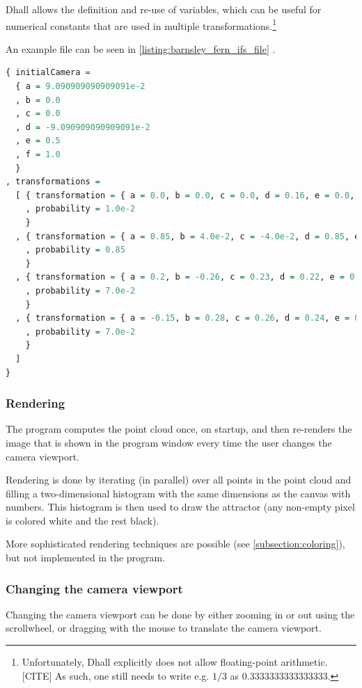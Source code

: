 \documentclass[11pt]{article}
\begin{document}
Dhall allows the definition and re-use of variables, which can be useful
for numerical constants that are used in multiple transformations.\footnote{Unfortunately, Dhall explicitly does not allow floating-point arithmetic.[CITE]
As such, one still needs to write e.g. \(1/3\) as \(0.3333333333333333\).}

An example file can be seen in \autoref{listing:barnsley_fern_ifs_file} .


\begin{lstlisting}[float, language=Haskell, frame=single, breaklines=true, basicstyle=\scriptsize\tt, captionpos=b, caption={barnsley\_fern.ifs, representing \autoref{ifs:barnsley_fern}}, label={listing:barnsley_fern_ifs_file}]
{ initialCamera =
  { a = 9.090909090909091e-2
  , b = 0.0
  , c = 0.0
  , d = -9.090909090909091e-2
  , e = 0.5
  , f = 1.0
  }
, transformations =
  [ { transformation = { a = 0.0, b = 0.0, c = 0.0, d = 0.16, e = 0.0, f = 0.0 }
    , probability = 1.0e-2
    }
  , { transformation = { a = 0.85, b = 4.0e-2, c = -4.0e-2, d = 0.85, e = 0.0, f = 1.6 }
    , probability = 0.85
    }
  , { transformation = { a = 0.2, b = -0.26, c = 0.23, d = 0.22, e = 0.0, f = 1.6 }
    , probability = 7.0e-2
    }
  , { transformation = { a = -0.15, b = 0.28, c = 0.26, d = 0.24, e = 0.0, f = 0.44 }
    , probability = 7.0e-2
    }
  ]
}

\end{lstlisting}

\subsubsection{Rendering}
\label{sec:org6dfbb5d}
The program computes the point cloud once, on startup, and then re-renders the image that is shown in the program window
every time the user changes the camera viewport.

Rendering is done by iterating (in parallel) over all points in the point cloud and filling a two-dimensional histogram with the same dimensions
as the canvas with numbers. 
This histogram is then used to draw the attractor (any non-empty pixel is colored white and the rest black).

More sophisticated rendering techniques are possible (see \autoref{subsection:coloring}), 
but not implemented in the program.

\subsubsection{Changing the camera viewport}
\label{sec:orgc96ea5c}
Changing the camera viewport can be done by either zooming in or out using the scrollwheel,
or dragging with the mouse to translate the camera viewport.
\end{document}
